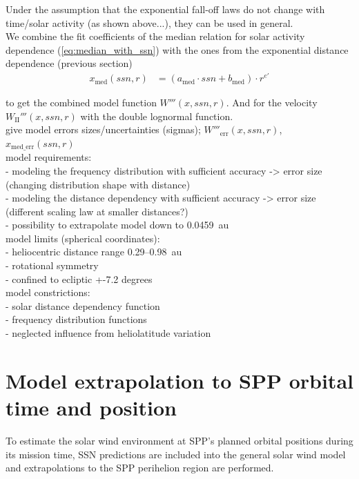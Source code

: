 Under the assumption that the exponential fall-off laws do not change with time/solar activity (as shown above...), they can be used in general.\\

We combine the fit coefficients of the median relation for solar activity dependence (\ref{eq:median_with_ssn}) with the ones from the exponential distance dependence (previous section)
\begin{align}
	x_\text{med}(ssn,r) &= (a_\text{med} \cdot ssn + b_\text{med}) \cdot r^{e'}
\end{align}

to get the combined model function $W'''(x,ssn,r)$. And for the velocity $W_\text{II}'''(x,ssn,r)$ with the double lognormal function.\\

give model errors sizes/uncertainties (sigmas); $W'''_\text{err}(x,ssn,r)$, $x_\text{med\_err}(ssn,r)$\\

model requirements:\\
- modeling the frequency distribution with sufficient accuracy -> error size (changing distribution shape with distance)\\
- modeling the distance dependency with sufficient accuracy -> error size (different scaling law at smaller distances?)\\
- possibility to extrapolate model down to 0.0459~au\\

model limits (spherical coordinates):\\
- heliocentric distance range 0.29--0.98~au\\
- rotational symmetry\\
- confined to ecliptic +-7.2 degrees\\
model constrictions:\\
- solar distance dependency function\\
- frequency distribution functions\\
- neglected influence from heliolatitude variation\\


\section{Model extrapolation to SPP orbital time and position}
To estimate the solar wind environment at SPP's planned orbital positions during its mission time, SSN predictions are included into the general solar wind model and extrapolations to the SPP perihelion region are performed.\\


